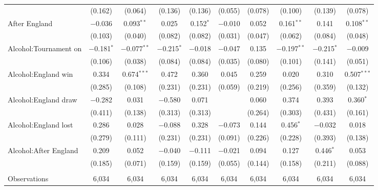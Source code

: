 \documentclass[12pt, a4paper]{article}
\begin{document}
\begin{table}
{\begin{threeparttable}
\begin{tabular}{@{\extracolsep{5pt}}lccccccccc}
  & (0.162) & (0.064) & (0.136) & (0.136) & (0.055) & (0.078) & (0.100) & (0.139) & (0.078) \\ 
  After England & $-$0.036 & 0.093$^{**}$ & 0.025 & 0.152$^{*}$ & $-$0.010 & 0.052 & 0.161$^{**}$ & 0.141 & 0.108$^{**}$ \\ 
  & (0.103) & (0.040) & (0.082) & (0.082) & (0.031) & (0.047) & (0.062) & (0.084) & (0.048) \\ 
  Alcohol:Tournament on & $-$0.181$^{*}$ & $-$0.077$^{**}$ & $-$0.215$^{*}$ & $-$0.018 & $-$0.047 & 0.135 & $-$0.197$^{**}$ & $-$0.215$^{*}$ & $-$0.009 \\ 
  & (0.106) & (0.038) & (0.084) & (0.084) & (0.035) & (0.080) & (0.101) & (0.141) & (0.051) \\ 
  Alcohol:England win & 0.334 & 0.674$^{***}$ & 0.472 & 0.360 & 0.045 & 0.259 & 0.020 & 0.310 & 0.507$^{***}$ \\ 
  & (0.285) & (0.108) & (0.231) & (0.231) & (0.059) & (0.219) & (0.256) & (0.359) & (0.132) \\ 
  Alcohol:England draw & $-$0.282 & 0.031 & $-$0.580 & 0.071 &  & 0.060 & 0.374 & 0.393 & 0.360$^{*}$ \\ 
  & (0.411) & (0.138) & (0.313) & (0.313) &  & (0.264) & (0.303) & (0.431) & (0.161) \\ 
  Alcohol:England lost & 0.286 & 0.028 & $-$0.088 & 0.328 & $-$0.073 & 0.144 & 0.456$^{*}$ & $-$0.032 & 0.018 \\ 
  & (0.279) & (0.111) & (0.231) & (0.231) & (0.091) & (0.226) & (0.228) & (0.393) & (0.138) \\ 
  Alcohol:After England & 0.209 & 0.052 & $-$0.040 & $-$0.111 & $-$0.021 & 0.094 & 0.127 & 0.446$^{*}$ & 0.053 \\ 
  & (0.185) & (0.071) & (0.159) & (0.159) & (0.055) & (0.144) & (0.158) & (0.211) & (0.088) \\ 
 \hline \\[-1.8ex] 
Observations & 6,034 & 6,034 & 6,034 & 6,034 & 6,034 & 6,034 & 6,034 & 6,034 & 6,034 \\ 

\end{tabular}
\end{threeparttable}}
\end{table}
\end{document}
